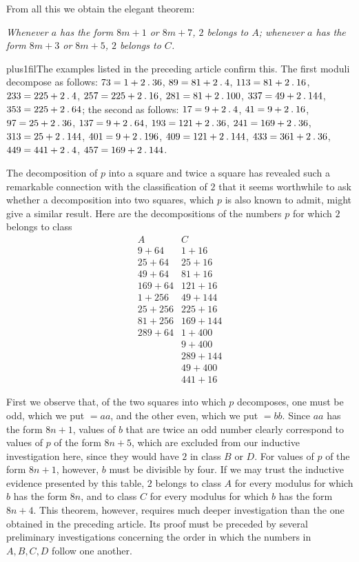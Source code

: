 From all this we obtain the elegant theorem:

\emph{Whenever $a$ has the form $8m+1$ or $8m+7$, $2$ belongs to $A$; whenever $a$ has the form $8m+3$ or $8m+5$, $2$ belongs to $C$.}

\begingroup\rightskip=0pt plus1fil\relax The examples listed in the preceding article confirm this. The first moduli decompose as follows: \mbox{$73=1+2\mathbin{.}36$}, \mbox{$89=81+2\mathbin{.}4$}, \mbox{$113=81+2\mathbin{.}16$}, \mbox{$233=225+2\mathbin{.}4$}, \mbox{$257=225+2\mathbin{.}16$}, \mbox{$281=81+2\mathbin{.}100$}, \mbox{$337=49+2\mathbin{.}144$}, \mbox{$353=225+2\mathbin{.}64$}; the second as follows: \mbox{$17=9+2\mathbin{.}4$}, \mbox{$41=9+2\mathbin{.}16$}, \mbox{$97=25+2\mathbin{.}36$}, \mbox{$137=9+2\mathbin{.}64$}, \mbox{$193=121+2\mathbin{.}36$}, \mbox{$241=169+2\mathbin{.}36$}, \mbox{$313=25+2\mathbin{.}144$}, \mbox{$401=9+2\mathbin{.}196$}, \mbox{$409=121+2\mathbin{.}144$}, \mbox{$433=361+2\mathbin{.}36$}, \mbox{$449=441+2\mathbin{.}4$}, \mbox{$457=169+2\mathbin{.}144$}.\par\endgroup

The decomposition of $p$ into a square and twice a square has revealed such a remarkable connection with the classification of $2$ that it seems worthwhile to ask whether a decomposition into two squares, which $p$ is also known to admit, might give a similar result. Here are the decompositions of the numbers $p$ for which $2$ belongs to class
\[
\begin{array}{c|c}
A&C\\\hline
9+64&1+16\\
25+64&25+16\\
49+64&81+16\\
169+64&121+16\\
1+256&49+144\\
25+256&225+16\\
81+256&169+144\\
289+64&1+400\\
&9+400\\
&289+144\\
&49+400\\
&441+16
\end{array}
\]

%
First we observe that, of the two squares into which $p$ decomposes, one must be odd, which we put $=aa$, and the other even, which we put $=bb$. Since $aa$ has the form $8n+1$, values of $b$ that are twice an odd number clearly correspond to values of $p$ of the form $8n+5$, which are excluded from our inductive investigation here, since they would have $2$ in class $B$ or $D$. For values of $p$ of the form $8n+1$, however, $b$ must be divisible by four. If we may trust the inductive evidence presented by this table, $2$ belongs to class $A$ for every modulus for which $b$ has the form $8n$, and to class $C$ for every modulus for which $b$ has the form $8n+4$. This theorem, however, requires much deeper investigation than the one obtained in the preceding article. Its proof must be preceded by several preliminary investigations concerning the order in which the numbers in $A,B,C,D$ follow one another.

